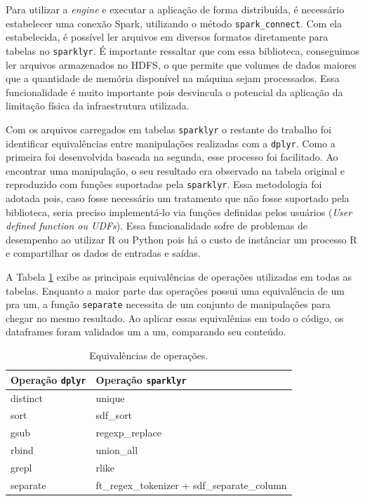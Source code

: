 Para utilizar a \textit{engine} e executar a aplicação de forma distribuída, é 
necessário estabelecer uma conexão Spark, utilizando o método 
\texttt{spark\_connect}. Com ela estabelecida, é possível ler arquivos em 
diversos formatos diretamente para tabelas no \texttt{sparklyr}. É importante 
ressaltar que com essa biblioteca, conseguimos ler arquivos armazenados no HDFS, 
o que permite que volumes de dados maiores que a quantidade de memória 
disponível na máquina sejam processados. Essa funcionalidade é muito importante 
pois desvincula o potencial da aplicação da limitação física da infraestrutura 
utilizada.

Com os arquivos carregados em tabelas \texttt{sparklyr} o restante do trabalho 
foi identificar equivalências entre manipulações realizadas com a 
\texttt{dplyr}. Como a primeira foi desenvolvida baseada na segunda, esse 
processo foi facilitado. Ao encontrar uma manipulação, o seu resultado era 
observado na tabela original e reproduzido com funções suportadas pela 
\texttt{sparklyr}. Essa metodologia foi adotada pois, caso fosse necessário um 
tratamento que não fosse suportado pela biblioteca, seria preciso implementá-lo 
via funções definidas pelos usuários (\emph{User defined function ou UDFs}). 
Essa funcionalidade sofre de problemas de desempenho ao utilizar R ou Python 
pois há o custo de instânciar um processo R e compartilhar os dados de entradas 
e saídas. 

A Tabela \ref{tab:equivalence} exibe as principais equivalências de operações 
utilizadas em todas as tabelas. Enquanto a maior parte das operações possui uma 
equivalência de um pra um, a função \texttt{separate} necessita de um conjunto 
de manipulações para chegar no mesmo resultado. Ao aplicar essas equivalênias em 
todo o código, os dataframes foram validados um a um, comparando seu conteúdo. 

\begin{table}[H]
\centering
\begin{tabular}{l l} \toprule
\textbf{Operação \texttt{dplyr}}  &  \textbf{Operação \texttt{sparklyr}}\\ 
\midrule
distinct	& unique  \\
sort		& sdf\_sort \\
gsub		& regexp\_replace\\
rbind		& union\_all\\
grepl		& rlike\\
separate	& ft\_regex\_tokenizer + sdf\_separate\_column       \\
\end{tabular}
\caption{Equivalências de operações.}
\label{tab:equivalence}
\end{table}

